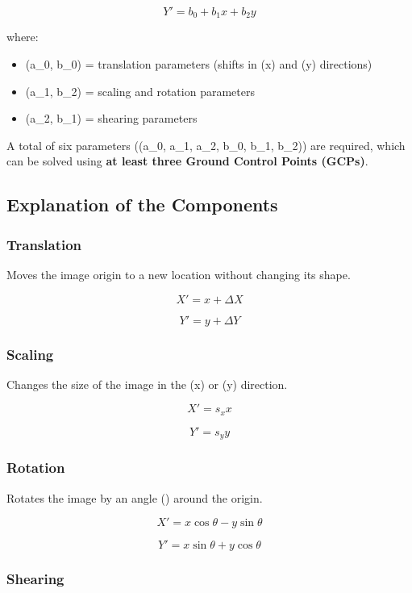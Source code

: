 \documentclass[
  11pt,
  letterpaper,
]{book}
\providecommand{\tightlist}{%
  \setlength{\itemsep}{0pt}\setlength{\parskip}{0pt}}
\begin{document}
\[
Y' = b_0 + b_1x + b_2y
\]

where:

\begin{itemize}
\tightlist
\item
  (a\_0, b\_0) = translation parameters (shifts in (x) and (y)
  directions)\\
\item
  (a\_1, b\_2) = scaling and rotation parameters\\
\item
  (a\_2, b\_1) = shearing parameters
\end{itemize}

A total of six parameters ((a\_0, a\_1, a\_2, b\_0, b\_1, b\_2)) are
required, which can be solved using \textbf{at least three Ground
Control Points (GCPs)}.

\subsection{Explanation of the
Components}\label{explanation-of-the-components}

\subsubsection{Translation}\label{translation}

Moves the image origin to a new location without changing its shape.

\[
X' = x + \Delta X
\]

\[
Y' = y + \Delta Y
\]

\subsubsection{Scaling}\label{scaling}

Changes the size of the image in the (x) or (y) direction.

\[
X' = s_x x
\]

\[
Y' = s_y y
\]

\subsubsection{Rotation}\label{rotation}

Rotates the image by an angle (\theta) around the origin.

\[
X' = x\cos\theta - y\sin\theta
\]

\[
Y' = x\sin\theta + y\cos\theta
\]

\subsubsection{Shearing}\label{shearing}
\end{document}
